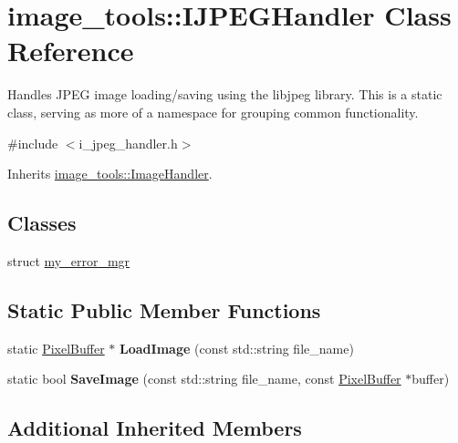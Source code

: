 \hypertarget{classimage__tools_1_1IJPEGHandler}{}\section{image\+\_\+tools\+:\+:I\+J\+P\+E\+G\+Handler Class Reference}
\label{classimage__tools_1_1IJPEGHandler}


Handles J\+P\+EG image loading/saving using the libjpeg library. This is a static class, serving as more of a namespace for grouping common functionality.  




{\ttfamily \#include $<$i\+\_\+jpeg\+\_\+handler.\+h$>$}



Inherits \hyperlink{classimage__tools_1_1ImageHandler}{image\+\_\+tools\+::\+Image\+Handler}.

\subsection*{Classes}
\begin{DoxyCompactItemize}
\item 
struct \hyperlink{structimage__tools_1_1IJPEGHandler_1_1my__error__mgr}{my\+\_\+error\+\_\+mgr}
\end{DoxyCompactItemize}
\subsection*{Static Public Member Functions}
\begin{DoxyCompactItemize}
\item 
static \hyperlink{classimage__tools_1_1PixelBuffer}{Pixel\+Buffer} $\ast$ {\bfseries Load\+Image} (const std\+::string file\+\_\+name)\hypertarget{classimage__tools_1_1IJPEGHandler_a8230699e4d2722b59026ce5cd61de947}{}\label{classimage__tools_1_1IJPEGHandler_a8230699e4d2722b59026ce5cd61de947}

\item 
static bool {\bfseries Save\+Image} (const std\+::string file\+\_\+name, const \hyperlink{classimage__tools_1_1PixelBuffer}{Pixel\+Buffer} $\ast$buffer)\hypertarget{classimage__tools_1_1IJPEGHandler_a9f4e3b2a9a1551cfeac6e43a59ead011}{}\label{classimage__tools_1_1IJPEGHandler_a9f4e3b2a9a1551cfeac6e43a59ead011}

\end{DoxyCompactItemize}
\subsection*{Additional Inherited Members}


